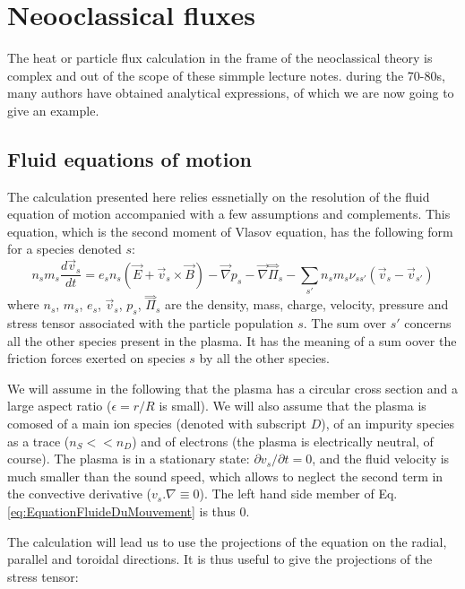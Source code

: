 		\section{Neooclassical fluxes}
		\label{sec:FluxNeoclassiques}

The heat or particle flux calculation in the frame of the neoclassical theory is complex and out of the scope of these simmple lecture notes. during the 70-80s, many authors have obtained analytical expressions, of which we are now going to give an example.

	
				\subsection{Fluid equations of motion}
				\label{sec:EquationFluideDuMouvement}


The calculation presented here relies essnetially on the resolution of the fluid equation of motion accompanied with a few assumptions and complements. This equation, which is the second moment of Vlasov equation, has the following form for a species denoted $s$:
 \begin{equation}
		n_s m_s \frac{d \vec{v}_s}{dt} = e_s n_s \left( \vec{E} + \vec{v}_s \times \vec{B} \right) - \vec{\nabla}p_s - \vec{\nabla}\stackrel{\Rightarrow}\Pi_s - \sum_{s'}n_s m_s \nu_{ss'}\left( \vec{v}_s - \vec{v}_{s'} \right)
		\label{eq:EquationFluideDuMouvement}
\end{equation}
where $n_s$, $m_s$, $e_s$, $\vec{v}_s$, $p_s$, $\stackrel{\Rightarrow}\Pi_s$  are the density, mass, charge, velocity, pressure and stress tensor associated with the particle population $s$. The sum over $s'$ concerns all the other species present in the plasma. It has the meaning of a sum oover the friction forces exerted on species $s$ by all the other species.

We will assume in the following that the plasma has a circular cross section and a large aspect ratio ($\epsilon = r/R$ is small). We will also assume that the plasma is comosed of a main ion species (denoted with subscript $D$), of an impurity species as a trace ($n_S << n_D$) and of electrons (the plasma is electrically neutral, of course). The plasma is in a stationary state: $\partial v_s/ \partial t = 0$, and the fluid velocity is much smaller than the sound speed, which allows to neglect the second term in the convective derivative ($v_s.\nabla \equiv 0$). The left hand side member of Eq. \ref{eq:EquationFluideDuMouvement} is thus 0.

The calculation will lead us to use the projections of the equation on the radial, parallel and toroidal directions. It is thus useful to give the projections of the stress tensor:

